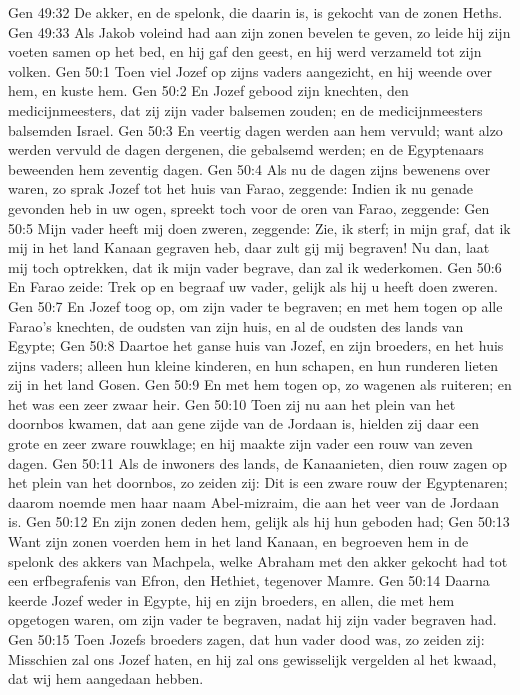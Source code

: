 Gen 49:32  De akker, en de spelonk, die daarin is, is gekocht van de zonen Heths.
Gen 49:33  Als Jakob voleind had aan zijn zonen bevelen te geven, zo leide hij zijn voeten samen op het bed, en hij gaf den geest, en hij werd verzameld tot zijn volken.
Gen 50:1  Toen viel Jozef op zijns vaders aangezicht, en hij weende over hem, en kuste hem.
Gen 50:2  En Jozef gebood zijn knechten, den medicijnmeesters, dat zij zijn vader balsemen zouden; en de medicijnmeesters balsemden Israel.
Gen 50:3  En veertig dagen werden aan hem vervuld; want alzo werden vervuld de dagen dergenen, die gebalsemd werden; en de Egyptenaars beweenden hem zeventig dagen.
Gen 50:4  Als nu de dagen zijns bewenens over waren, zo sprak Jozef tot het huis van Farao, zeggende: Indien ik nu genade gevonden heb in uw ogen, spreekt toch voor de oren van Farao, zeggende:
Gen 50:5  Mijn vader heeft mij doen zweren, zeggende: Zie, ik sterf; in mijn graf, dat ik mij in het land Kanaan gegraven heb, daar zult gij mij begraven! Nu dan, laat mij toch optrekken, dat ik mijn vader begrave, dan zal ik wederkomen.
Gen 50:6  En Farao zeide: Trek op en begraaf uw vader, gelijk als hij u heeft doen zweren.
Gen 50:7  En Jozef toog op, om zijn vader te begraven; en met hem togen op alle Farao's knechten, de oudsten van zijn huis, en al de oudsten des lands van Egypte;
Gen 50:8  Daartoe het ganse huis van Jozef, en zijn broeders, en het huis zijns vaders; alleen hun kleine kinderen, en hun schapen, en hun runderen lieten zij in het land Gosen.
Gen 50:9  En met hem togen op, zo wagenen als ruiteren; en het was een zeer zwaar heir.
Gen 50:10  Toen zij nu aan het plein van het doornbos kwamen, dat aan gene zijde van de Jordaan is, hielden zij daar een grote en zeer zware rouwklage; en hij maakte zijn vader een rouw van zeven dagen.
Gen 50:11  Als de inwoners des lands, de Kanaanieten, dien rouw zagen op het plein van het doornbos, zo zeiden zij: Dit is een zware rouw der Egyptenaren; daarom noemde men haar naam Abel-mizraim, die aan het veer van de Jordaan is.
Gen 50:12  En zijn zonen deden hem, gelijk als hij hun geboden had;
Gen 50:13  Want zijn zonen voerden hem in het land Kanaan, en begroeven hem in de spelonk des akkers van Machpela, welke Abraham met den akker gekocht had tot een erfbegrafenis van Efron, den Hethiet, tegenover Mamre.
Gen 50:14  Daarna keerde Jozef weder in Egypte, hij en zijn broeders, en allen, die met hem opgetogen waren, om zijn vader te begraven, nadat hij zijn vader begraven had.
Gen 50:15  Toen Jozefs broeders zagen, dat hun vader dood was, zo zeiden zij: Misschien zal ons Jozef haten, en hij zal ons gewisselijk vergelden al het kwaad, dat wij hem aangedaan hebben.
